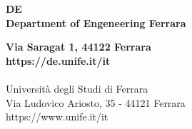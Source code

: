 \thispagestyle{empty} %
\vspace*{\fill}
\sffamily

\Large{
\noindent
\textbf{DE}\\
\textbf{Department of Engeneering Ferrara}\\
}

\small
\noindent
\textbf{Via Saragat 1, 44122 Ferrara}\\
\textbf{https://de.unife.it/it}\\
\\
Università degli Studi di Ferrara\\
Via Ludovico Ariosto, 35 - 44121 Ferrara\\
https://www.unife.it/it\\
\normalsize
\normalfont
\vspace*{2.5cm}
